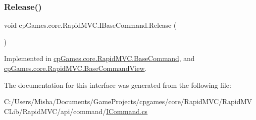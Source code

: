 \subsubsection{\texorpdfstring{Release()}{Release()}}
{\footnotesize\ttfamily void cp\+Games.\+core.\+Rapid\+M\+V\+C.\+I\+Base\+Command.\+Release (\begin{DoxyParamCaption}{ }\end{DoxyParamCaption})}



Implemented in \mbox{\hyperlink{classcp_games_1_1core_1_1_rapid_m_v_c_1_1_base_command_afa3a355d140a2a088cfa7e5f4d71a07b}{cp\+Games.\+core.\+Rapid\+M\+V\+C.\+Base\+Command}}, and \mbox{\hyperlink{classcp_games_1_1core_1_1_rapid_m_v_c_1_1_base_command_view_af5c36b96f3c29382b3809bd0c25130c3}{cp\+Games.\+core.\+Rapid\+M\+V\+C.\+Base\+Command\+View}}.



The documentation for this interface was generated from the following file\+:\begin{DoxyCompactItemize}
\item 
C\+:/\+Users/\+Misha/\+Documents/\+Game\+Projects/cpgames/core/\+Rapid\+M\+V\+C/\+Rapid\+M\+V\+C\+Lib/\+Rapid\+M\+V\+C/api/command/\mbox{\hyperlink{_i_command_8cs}{I\+Command.\+cs}}\end{DoxyCompactItemize}
